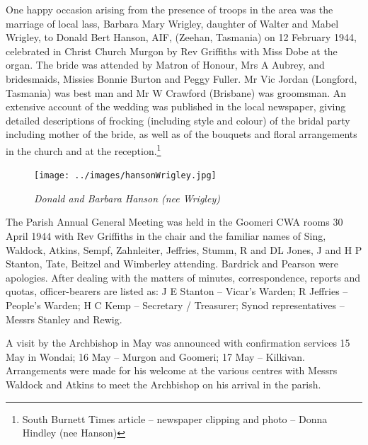 One happy occasion arising from the presence of troops in the area was the marriage of local lass, Barbara Mary Wrigley, daughter of Walter and Mabel Wrigley, to Donald Bert Hanson, AIF, (Zeehan, Tasmania) on 12 February 1944, celebrated in Christ Church Murgon by Rev Griffiths with Miss Dobe at the organ. The bride was attended by Matron of Honour, Mrs A Aubrey, and bridesmaids, Missies Bonnie Burton and Peggy Fuller. Mr Vic Jordan (Longford, Tasmania) was best man and Mr W Crawford (Brisbane) was groomsman. An extensive account of the wedding was published in the local newspaper, giving detailed descriptions of frocking (including style and colour) of the bridal party including mother of the bride, as well as of the bouquets and floral arrangements in the church and at the reception.\footnote{South Burnett Times article -- newspaper clipping and photo -- Donna Hindley (nee Hanson)}








\begin{figure}
\begin{center}
\texttt{[image: ../images/hansonWrigley.jpg]}
\caption{\itshape Donald and Barbara Hanson (nee Wrigley)}
\end{center}
\end{figure}




\balance


The Parish Annual General Meeting was held in the Goomeri CWA rooms 30 April 1944 with Rev Griffiths in the chair and the familiar names of Sing, Waldock, Atkins, Sempf, Zahnleiter, Jeffries, Stumm, R and DL Jones, J and H P Stanton, Tate, Beitzel and Wimberley attending. Bardrick and Pearson were apologies. After dealing with the matters of minutes, correspondence, reports and quotas, officer-bearers are listed as: J E Stanton -- Vicar's Warden; R Jeffries -- People's Warden; H C Kemp -- Secretary / Treasurer; Synod representatives -- Messrs Stanley and Rewig.



A visit by the Archbishop in May was announced with confirmation services 15 May in Wondai; 16 May -- Murgon and Goomeri; 17 May -- Kilkivan. Arrangements were made for his welcome at the various centres with Messrs Waldock and Atkins to meet the Archbishop on his arrival in the parish.









